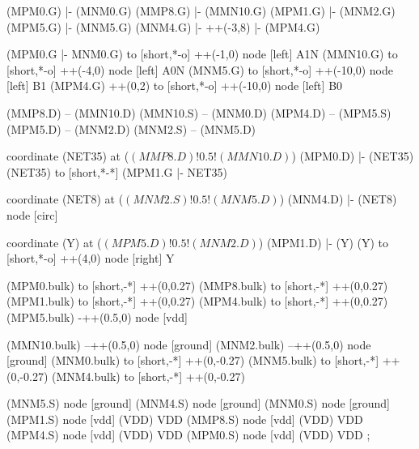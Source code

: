 \begin{circuitikz}[american]
		
	(MPM0.G) |- (MNM0.G)
	(MMP8.G) |- (MMN10.G)
	(MPM1.G) |- (MNM2.G)
	(MPM5.G) |- (MNM5.G)
	(MNM4.G) |- ++(-3,8) |- (MPM4.G)
	
	(MPM0.G |- MNM0.G) to [short,*-o] ++(-1,0) node [left] {A1N} 
	(MMN10.G) to [short,*-o] ++(-4,0) node [left] {A0N}
	(MNM5.G) to [short,*-o] ++(-10,0) node [left] {B1}
	(MPM4.G) ++(0,2) to [short,*-o] ++(-10,0) node [left] {B0}
	
	(MMP8.D) -- (MMN10.D)
	(MMN10.S) -- (MNM0.D)
	(MPM4.D) -- (MPM5.S)
	(MPM5.D) -- (MNM2.D)
	(MNM2.S) -- (MNM5.D)	
	
	coordinate (NET35) at ($(MMP8.D)!0.5!(MMN10.D)$)
	(MPM0.D) |- (NET35)
	(NET35) to [short,*-*] (MPM1.G |- NET35)
	
	coordinate (NET8) at ($(MNM2.S)!0.5!(MNM5.D)$)
	(MNM4.D) |- (NET8) node [circ] {}
	
	coordinate (Y) at ($(MPM5.D)!0.5!(MNM2.D)$)
	(MPM1.D) |- (Y)
	(Y) to [short,*-o] ++(4,0) node [right] {Y}
	
	(MPM0.bulk) to [short,-*] ++(0,0.27)
	(MMP8.bulk) to [short,-*] ++(0,0.27)
	(MPM1.bulk) to [short,-*] ++(0,0.27)
	(MPM4.bulk) to [short,-*] ++(0,0.27)
	(MPM5.bulk) -++(0.5,0) node [vdd]{}
	
	(MMN10.bulk) --++(0.5,0) node [ground]{}
	(MNM2.bulk) --++(0.5,0) node [ground]{}
	(MNM0.bulk) to [short,-*] ++(0,-0.27)	
	(MNM5.bulk) to [short,-*] ++(0,-0.27)
	(MNM4.bulk) to [short,-*] ++(0,-0.27)


	(MNM5.S) node [ground] {}
	(MNM4.S) node [ground] {}
	(MNM0.S) node [ground] {}
	(MPM1.S) node [vdd] (VDD) {VDD}
	(MMP8.S) node [vdd] (VDD) {VDD}
	(MPM4.S) node [vdd] (VDD) {VDD}
	(MPM0.S) node [vdd] (VDD) {VDD}
;

\end{circuitikz}
